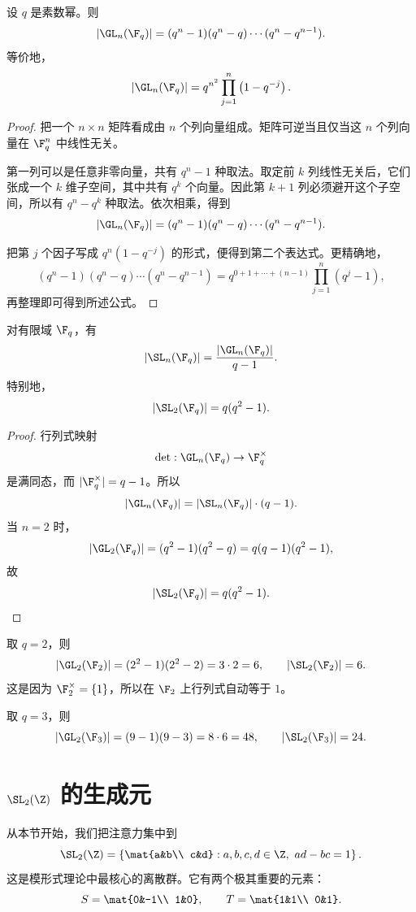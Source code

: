 \begin{proposition}
设 $q$ 是素数幂。则
\[
|\GL_n(\F_q)|=(q^n-1)(q^n-q)\cdots(q^n-q^{n-1}).
\]
等价地，
\[
|\GL_n(\F_q)|=q^{n^2}\prod_{j=1}^n\left(1-q^{-j}\right).
\]
\end{proposition}

\begin{proof}
把一个 $n\times n$ 矩阵看成由 $n$ 个列向量组成。矩阵可逆当且仅当这 $n$ 个列向量在 $\F_q^n$ 中线性无关。

第一列可以是任意非零向量，共有 $q^n-1$ 种取法。取定前 $k$ 列线性无关后，它们张成一个 $k$ 维子空间，其中共有 $q^k$ 个向量。因此第 $k+1$ 列必须避开这个子空间，所以有 $q^n-q^k$ 种取法。依次相乘，得到
\[
|\GL_n(\F_q)|=(q^n-1)(q^n-q)\cdots(q^n-q^{n-1}).
\]

把第 $j$ 个因子写成 $q^n(1-q^{-j})$ 的形式，便得到第二个表达式。更精确地，
\[
(q^n-1)(q^n-q)\cdots(q^n-q^{n-1})
= q^{0+1+\cdots+(n-1)}\prod_{j=1}^n(q^j-1),
\]
再整理即可得到所述公式。
\end{proof}

\begin{corollary}
对有限域 $\F_q$，有
\[
|\SL_n(\F_q)|=\frac{|\GL_n(\F_q)|}{q-1}.
\]
特别地，
\[
|\SL_2(\F_q)|=q(q^2-1).
\]
\end{corollary}

\begin{proof}
行列式映射
\[
\det:\GL_n(\F_q)\to \F_q^\times
\]
是满同态，而 $|\F_q^\times|=q-1$。所以
\[
|\GL_n(\F_q)|=|\SL_n(\F_q)|\cdot(q-1).
\]
当 $n=2$ 时，
\[
|\GL_2(\F_q)|=(q^2-1)(q^2-q)=q(q-1)(q^2-1),
\]
故
\[
|\SL_2(\F_q)|=q(q^2-1).
\]
\end{proof}

\begin{example}
取 $q=2$，则
\[
|\GL_2(\F_2)|=(2^2-1)(2^2-2)=3\cdot 2=6,
\qquad
|\SL_2(\F_2)|=6.
\]
这是因为 $\F_2^\times=\{1\}$，所以在 $\F_2$ 上行列式自动等于 $1$。

取 $q=3$，则
\[
|\GL_2(\F_3)|=(9-1)(9-3)=8\cdot 6=48,
\qquad
|\SL_2(\F_3)|=24.
\]
\end{example}

\section{$\SL_2(\Z)$ 的生成元}

从本节开始，我们把注意力集中到
\[
\SL_2(\Z)=\left\{\mat{a&b\\ c&d}:a,b,c,d\in\Z,\ ad-bc=1\right\}.
\]
这是模形式理论中最核心的离散群。它有两个极其重要的元素：
\[
S=\mat{0&-1\\ 1&0},
\qquad
T=\mat{1&1\\ 0&1}.
\]

